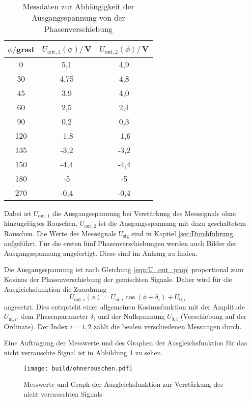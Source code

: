 \begin{table}
\centering
\caption{Messdaten zur Abhängigkeit der Ausgangsspannung von der Phasenverschiebung}
\label{tab:phase}
\begin{tabular}{c c c}
\toprule
$\phi/$grad & $U_\mathrm{out,1}(\phi)/$\,V & $U_\mathrm{out,2}(\phi)/$\,V \\
\midrule
  0	& 5,1	 & 4,9  \\
 30	&	4,75 & 4,8  \\
 45	&	3,9	 & 4,0  \\
 60	&	2,5	 & 2,4  \\
 90	&	0,2	 & 0,3  \\
120 &	-1,8 & -1,6 \\
135 &	-3,2 & -3,2 \\
150 &	-4,4 & -4,4 \\
180 &	-5   & -5   \\
270 &	-0,4 & -0,4 \\
\bottomrule
\end{tabular}
\end{table}

Dabei ist $U_\mathrm{out,1}$ die Ausgangsspannung bei Verstärkung des Messsignals
ohne hinzugefügtes Rauschen, $U_\mathrm{out,2}$ ist die Ausgangsspannung mit dazu geschaltetem
Rauschen. Die Werte des Messsignals $U_\mathrm{sig}$ sind in Kapitel \ref{sec:Durchführung}
aufgeführt.
Für die ersten fünf Phasenverschiebungen werden auch Bilder der Ausgangsspannung
angefertigt. Diese sind im Anhang zu finden.

Die Ausgangsspannung ist nach Gleichung \eqref{eqn:U_out_prop} proportional zum Kosinus der
Phasenverschiebung der gemischten Signale. Daher wird für die Ausgleichsfunktion
die Zuordnung
\begin{equation}
  U_{\mathrm{out,}i}(\phi) = U_{\mathrm{m,}i} \cos(\phi+\delta_i)+ U_{0,i}
  \label{eqn:fit}
\end{equation}
angesetzt. Dies entspricht einer allgemeinen Kosinusfunktion mit der Amplitude
$U_{\mathrm{m},i}$, dem Phasenparameter $\delta_i$ und der Nullspannung $U_{0,i}$ (Verschiebung
auf der Ordinate). Der Index $i=1,2$ zählt die beiden verschiedenen Messungen durch.

Eine Auftragung der Messwerte und des Graphen der Ausgleichsfunktion für das nicht
verrauschte Signal ist in Abbildung \ref{fig:nichtrausch} zu sehen.

\begin{figure}
  \centering
  \texttt{[image: build/ohnerauschen.pdf]}
  \caption{Messwerte und Graph der Ausgleichsfunktion zur Verstärkung des nicht verrauschten Signals}
  \label{fig:nichtrausch}
\end{figure}


